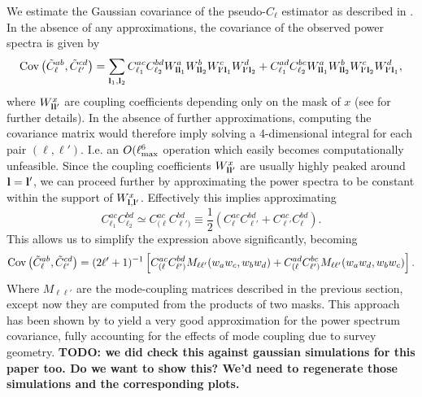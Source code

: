 \documentclass[a4paper,11pt]{article}
\newcommand{\todo}[1]{{\bf TODO: #1}}
\begin{document}
    We estimate the Gaussian covariance of the pseudo-$C_\ell$ estimator as described in \cite{2004MNRAS.349..603E,2019arXiv190611765G}. In the absence of any approximations, the covariance of the observed power spectra is given by
    \begin{equation}
      {\rm Cov}\left(\tilde{C}^{ab}_\ell,\tilde{C}^{cd}_{\ell'}\right)=\sum_{{\bf l}_1,{\bf l}_2} C^{ac}_{\ell_1}C^{bd}_{\ell_2}W^a_{{\bf l}{\bf l}_1}W^b_{{\bf l}{\bf l}_2}W^c_{{\bf l}'{\bf l}_1}W^d_{{\bf l}'{\bf l}_2} + C^{ad}_{\ell_1}C^{bc}_{\ell_2}W^a_{{\bf l}{\bf l}_1}W^b_{{\bf l}{\bf l}_2}W^c_{{\bf l}'{\bf l}_2}W^d_{{\bf l}'{\bf l}_1},
    \end{equation}
    where $W^x_{{\bf l}{\bf l}'}$ are coupling coefficients depending only on the mask of $x$ (see \cite{2019arXiv190611765G} for further details). In the absence of further approximations, computing the covariance matrix would therefore imply solving a 4-dimensional integral for each pair $(\ell,\ell')$. I.e. an $O(\ell_{\rm max}^6$ operation which easily becomes computationally unfeasible. Since the coupling coefficients $W^x_{{\bf l}{\bf l}'}$ are usually highly peaked around ${\bf l}={\bf l}'$, we can proceed further by approximating the power spectra to be constant within the support of $W^x_{{\bf l},{\bf l}'}$. Effectively this implies approximating
    \begin{equation}
      C^{ac}_{\ell_1}C^{bd}_{\ell_2}\simeq C^{ac}_{(\ell}C^{bd}_{\ell')}\equiv\frac{1}{2}\left(C^{ac}_\ell C^{bd}_{\ell'}+C^{ac}_{\ell'} C^{bd}_\ell\right).
    \end{equation}
    This allows us to simplify the expression above significantly, becoming
    \begin{equation}
      {\rm Cov}\left(\tilde{C}^{ab}_\ell,\tilde{C}^{cd}_{\ell'}\right)=(2\ell'+1)^{-1}\left[C^{ac}_{(\ell}C^{bd}_{\ell')}M_{\ell\ell'}(w_aw_c,w_bw_d)+C^{ad}_{(\ell}C^{bc}_{\ell')}M_{\ell\ell'}(w_aw_d,w_bw_c)\right].
    \end{equation}
    Where $M_{\ell\ell'}$ are the mode-coupling matrices described in the previous section, except now they are computed from the products of two masks. This approach has been shown by \cite{2019arXiv190611765G} to yield a very good approximation for the power spectrum covariance, fully accounting for the effects of mode coupling due to survey geometry. \todo{we did check this against gaussian simulations for this paper too. Do we want to show this? We'd need to regenerate those simulations and the corresponding plots.}
    
\end{document}
